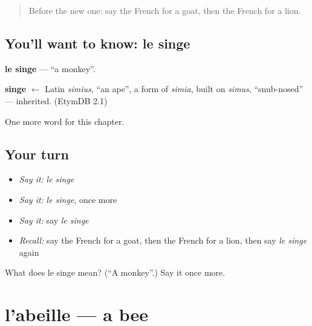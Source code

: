 \label{lesson:FR-C87-singe}



\begin{quote}
Before the new one: say the French for a goat, then the French for a lion.
\end{quote}

\subsection*{You'll want to know: le singe}
\textbf{le singe} — \textquotedblleft{}a monkey\textquotedblright{}.

\begin{cousinweb}
\textbf{singe} $\leftarrow$ Latin \emph{simius}, \textquotedblleft{}an ape\textquotedblright{}, a form of \emph{simia}, built on \emph{simus}, \textquotedblleft{}snub-nosed\textquotedblright{} — inherited. (EtymDB 2.1)
\end{cousinweb}

\begin{grammarlens}[title={What you've built}]
One more word for this chapter.
\end{grammarlens}

\subsection*{Your turn}
\begin{itemize}
\raggedright
  \item \emph{Say it:} \emph{le singe}
  \item \emph{Say it:} \emph{le singe}, once more
  \item \emph{Say it:} say \emph{le singe}
  \item \emph{Recall:} say the French for a goat, then the French for a lion, then say \emph{le singe} again
\end{itemize}

\begin{tcolorbox}[breakable,colback=teal!4,colframe=teal!35!black,title={Before you move on}]
What does le singe mean? (\textquotedblleft{}A monkey\textquotedblright{}.) Say it once more.
\end{tcolorbox}
\section[l'abeille]{l'abeille — a bee}

\label{lesson:FR-C87-abeille}



